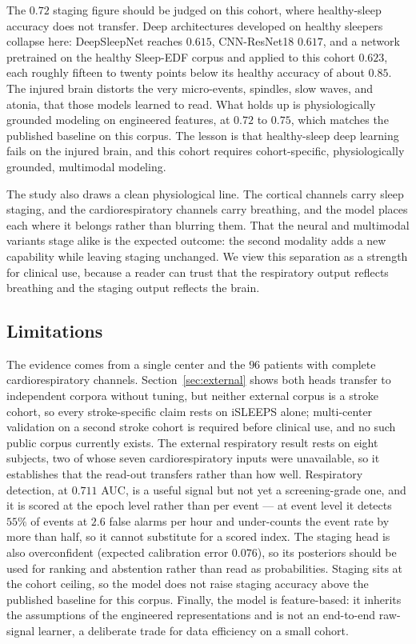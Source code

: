 \documentclass[journal]{IEEEtran}
\newcommand{\mmAuc}{0.711}
\begin{document}
The $0.72$ staging figure should be judged on this cohort, where healthy-sleep accuracy does not transfer. Deep
architectures developed on healthy sleepers collapse here: DeepSleepNet reaches $0.615$,
CNN-ResNet18 $0.617$, and a network pretrained on the healthy Sleep-EDF corpus and applied to
this cohort $0.623$, each roughly fifteen to twenty points below its healthy accuracy of about
$0.85$. The injured brain distorts the very micro-events, spindles, slow waves, and atonia, that
those models learned to read. What holds up is physiologically grounded modeling on engineered
features, at $0.72$ to $0.75$, which matches the published baseline on this corpus. The lesson is
that healthy-sleep deep learning fails on the injured brain, and this cohort requires
cohort-specific, physiologically grounded, multimodal modeling.

The study also draws a clean physiological line. The cortical channels carry sleep staging, and
the cardiorespiratory channels carry breathing, and the model places each where it belongs
rather than blurring them. That the neural and multimodal variants stage alike is the expected
outcome: the second modality adds a new capability while leaving staging unchanged. We view this separation as a strength for
clinical use, because a reader can trust that the respiratory output reflects breathing and the
staging output reflects the brain.

\subsection{Limitations}
The evidence comes from a single center and the $96$ patients with
complete cardiorespiratory channels. Section~\ref{sec:external} shows both heads
transfer to independent corpora without tuning, but neither external corpus is a stroke
cohort, so every stroke-specific claim rests on iSLEEPS alone; multi-center validation on
a second stroke cohort is required before clinical use, and no such public corpus
currently exists. The external respiratory result rests on eight subjects, two of whose
seven cardiorespiratory inputs were unavailable, so it establishes that the read-out
transfers rather than how well. Respiratory detection, at $\mmAuc$ AUC, is a useful signal but not yet a
screening-grade one, and it is scored at the epoch level rather than per event --- at
event level it detects $55\%$ of events at $2.6$ false alarms per hour and under-counts
the event rate by more than half, so it cannot substitute for a scored index. The
staging head is also overconfident (expected calibration error $0.076$), so its
posteriors should be used for ranking and abstention rather than read as probabilities. Staging sits at
the cohort ceiling, so the model does not raise staging accuracy above the published
baseline for this corpus. Finally, the model is feature-based: it inherits the assumptions of the engineered
representations and is not an end-to-end raw-signal learner, a deliberate trade for data
efficiency on a small cohort.
\end{document}
